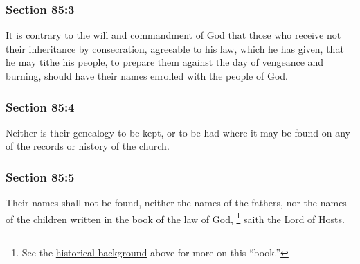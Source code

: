 	\subsubsection{Section 85:3} %
		\label{DC85-3}

		It is contrary to the will and commandment of God that those who receive not their inheritance by consecration, agreeable to his law, which he has given, that he may tithe his people, to prepare them against the day of vengeance and burning, should have their names enrolled with the people of God.


	\subsubsection{Section 85:4} %
		\label{DC85-4}

		Neither is their genealogy to be kept, or to be had where it may be found on any of the records or history of the church.


	\subsubsection{Section 85:5} %
		\label{DC85-5}

		Their names shall not be found, neither the names of the fathers, nor the names of the children written in the book of the law of God,%
			\footnote{%
				See the \hyperref[DC85-HB]{historical background} above for more on this ``book.''
				}
		saith the Lord of Hosts.

